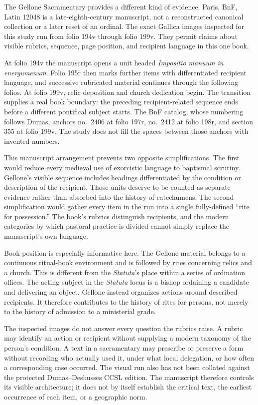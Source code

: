 The Gellone Sacramentary provides a different kind of evidence. Paris, BnF,
Latin 12048 is a late-eighth-century manuscript, not a reconstructed canonical
collection or a later reset of an ordinal. The exact Gallica images inspected
for this study run from folio 194v through folio 199v. They permit claims about
visible rubrics, sequence, page position, and recipient language in this one
book.

At folio 194v the manuscript opens a unit headed \emph{Impositio manuum in
energumenum}. Folio 195r then marks further items with differentiated
recipient language, and successive rubricated material continues through the
following folios. At folio 199v, relic deposition and church dedication begin.
The transition supplies a real book boundary: the preceding recipient-related
sequence ends before a different pontifical subject starts. The BnF catalog,
whose numbering follows Dumas, anchors no.~2406 at folio 197r, no.~2412 at
folio 198r, and section 355 at folio 199v. The study does not fill the spaces
between those anchors with invented numbers.

This manuscript arrangement prevents two opposite simplifications. The first
would reduce every medieval use of exorcistic language to baptismal scrutiny.
Gellone's visible sequence includes headings differentiated by the condition
or description of the recipient. Those units deserve to be counted as
separate evidence rather than absorbed into the history of catechumens. The
second simplification would gather every item in the run into a single
fully-defined ``rite for possession.'' The book's rubrics distinguish
recipients, and the modern categories by which pastoral practice is divided
cannot simply replace the manuscript's own language.

Book position is especially informative here. The Gellone material belongs to
a continuous ritual-book environment and is followed by rites concerning
relics and a church. This is different from the \emph{Statuta}'s place within
a series of ordination offices. The acting subject in the \emph{Statuta} locus
is a bishop ordaining a candidate and delivering an object. Gellone instead
organizes actions around described recipients. It therefore contributes to
the history of rites for persons, not merely to the history of admission to a
ministerial grade.

The inspected images do not answer every question the rubrics raise. A rubric
may identify an action or recipient without supplying a modern taxonomy of
the person's condition. A text in a sacramentary may prescribe or preserve a
form without recording who actually used it, under what local delegation, or
how often a corresponding case occurred. The visual run also has not been
collated against the protected Dumas--Deshusses CCSL edition. The manuscript
therefore controls its visible architecture; it does not by itself establish
the critical text, the earliest occurrence of each item, or a geographic
norm.

